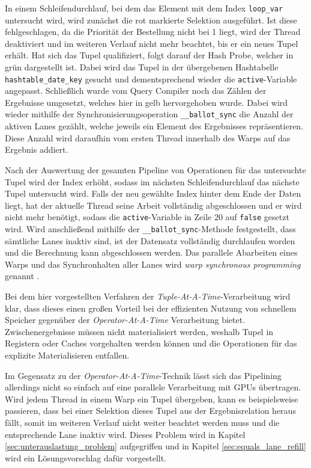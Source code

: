 In einem Schleifendurchlauf, bei dem das Element mit dem Index \texttt{loop\_var} untersucht wird, wird zunächst die rot markierte Selektion ausgeführt.
Ist diese fehlgeschlagen, da die Priorität der Bestellung nicht bei 1 liegt, wird der Thread deaktiviert und im weiteren Verlauf nicht mehr beachtet, bis er ein neues Tupel erhält.
Hat sich das Tupel qualifiziert, folgt darauf der Hash Probe, welcher in grün dargestellt ist.
Dabei wird das Tupel in der übergebenen Hashtabelle \texttt{hashtable\_date\_key} gesucht und dementsprechend wieder die \texttt{active}-Variable angepasst.
Schließlich wurde vom Query Compiler noch das Zählen der Ergebnisse umgesetzt, welches hier in gelb hervorgehoben wurde.
Dabei wird wieder mithilfe der Synchronisierungsoperation \texttt{\_\_ballot\_sync} die Anzahl der aktiven Lanes gezählt, welche jeweils ein Element des Ergebnisses repräsentieren.
Diese Anzahl wird daraufhin vom ersten Thread innerhalb des Warps auf das Ergebnis addiert. 

Nach der Auswertung der gesamten Pipeline von Operationen für das untersuchte Tupel wird der Index erhöht, sodass im nächsten Schleifendurchlauf das nächste Tupel untersucht wird.
Falls der neu gewählte Index hinter dem Ende der Daten liegt, hat der aktuelle Thread seine Arbeit vollständig abgeschlossen und er wird nicht mehr benötigt, sodass die \texttt{active}-Variable in Zeile 20 auf \texttt{false} gesetzt wird.
Wird anschließend mithilfe der \texttt{\_\_ballot\_sync}-Methode festgestellt, dass sämtliche Lanes inaktiv sind, ist der Datensatz vollständig durchlaufen worden und die Berechnung kann abgeschlossen werden.
Das parallele Abarbeiten eines Warps und das Synchronhalten aller Lanes wird \emph{warp synchronous programming} genannt \cite{Lin2018}.

Bei dem hier vorgestellten Verfahren der \emph{Tuple-At-A-Time}-Verarbeitung wird klar, dass dieses einen großen Vorteil bei der effizienten Nutzung von schnellem Speicher gegenüber der \emph{Operator-At-A-Time} Verarbeitung bietet.
Zwischenergebnisse müssen nicht materialisiert werden, weshalb Tupel in Registern oder Caches vorgehalten werden können und die Operationen für das explizite Materialisieren entfallen.

Im Gegensatz zu der \emph{Operator-At-A-Time}-Technik lässt sich das Pipelining allerdings nicht so einfach auf eine parallele Verarbeitung mit GPUs übertragen.
Wird jedem Thread in einem Warp ein Tupel übergeben, kann es beispielsweise passieren, dass bei einer Selektion dieses Tupel aus der Ergebnisrelation heraus fällt, somit im weiteren Verlauf nicht weiter beachtet werden muss und die entsprechende Lane inaktiv wird.
Dieses Problem wird in Kapitel \ref{sec:unterauslastung_problem} aufgegriffen und in Kapitel \ref{sec:equals_lane_refill} wird ein Lösungsvorschlag dafür vorgestellt.
